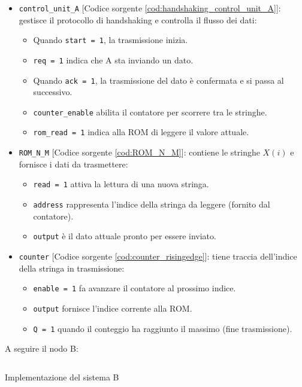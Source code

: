 \begin{itemize}
    \item \texttt{control\_unit\_A} [Codice sorgente \ref{cod:handshaking_control_unit_A}]: gestisce il protocollo di handshaking e controlla il flusso dei dati:
    \begin{itemize}
        \item Quando \texttt{start = 1}, la trasmissione inizia.
        \item \texttt{req = 1} indica che A sta inviando un dato.
        \item Quando \texttt{ack = 1}, la trasmissione del dato è confermata e si passa al successivo.
        \item \texttt{counter\_enable} abilita il contatore per scorrere tra le stringhe.
        \item \texttt{rom\_read = 1} indica alla ROM di leggere il valore attuale.
    \end{itemize}
    \item \texttt{ROM\_N\_M} [Codice sorgente \ref{cod:ROM_N_M}]: contiene le stringhe $X(i)$ e fornisce i dati da trasmettere:
    \begin{itemize}
        \item \texttt{read = 1} attiva la lettura di una nuova stringa.
        \item \texttt{address} rappresenta l'indice della stringa da leggere (fornito dal contatore).
        \item \texttt{output} è il dato attuale pronto per essere inviato.
    \end{itemize}
    \item \texttt{counter} [Codice sorgente \ref{cod:counter_risingedge}]: tiene traccia dell'indice della stringa in trasmissione:
    \begin{itemize}
        \item \texttt{enable = 1} fa avanzare il contatore al prossimo indice.
        \item \texttt{output} fornisce l'indice corrente alla ROM.
        \item \texttt{Q = 1} quando il conteggio ha raggiunto il massimo (fine trasmissione).
    \end{itemize}
\end{itemize}

A seguire il nodo B:

\begin{code}
    \inputminted{vhdl}{vhdl/handshaking_system_B.vhd}
    \caption{Implementazione del sistema B}
    \label{cod:handshaking_system_B}
\end{code}

